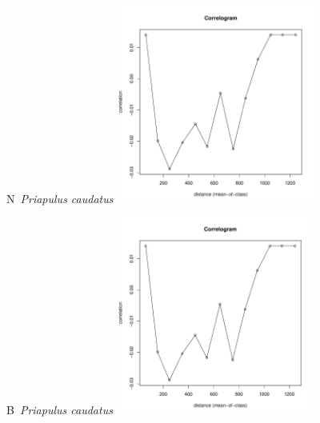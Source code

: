 \documentclass[12pt, a4paper]{disser}
\begin{document}
	\begin{figure}[h]

	\begin{minipage}[b]{.46\linewidth}
	\begin{center}
	{\small N~{\it Priapulus caudatus}}
		\includegraphics[width=65mm]{../Barenc_Sea/distribution_Moran/Plyazh0812_moran_N_Priapulus_caudatus_.pdf}
	\end{center}
	\end{minipage}
%
	\hfil %
%
	\begin{minipage}[b]{.46\linewidth}
	\begin{center}
	{\small B~{\it Priapulus caudatus}}
		\includegraphics[width=65mm]{../Barenc_Sea/distribution_Moran/Plyazh0812_moran_B_Priapulus_caudatus_.pdf}
	\end{center}
	\end{minipage}


\end{figure}
\end{document}
